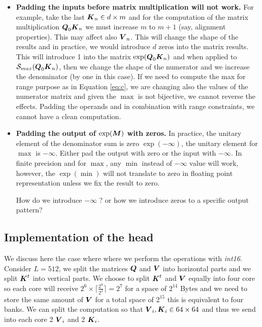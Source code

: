 \documentclass[journal]{IEEEtran}
\begin{document}
\begin{itemize}
  \item {\bf Padding the inputs before matrix multiplication will not
    work.} For example, take the last ${\boldsymbol K}_n \in d\times m$ and for
    the computation of the matrix multiplication ${\boldsymbol Q}_0{\boldsymbol K}_n$ we
    must increase $m$ to $m+1$ (say, alignment properties). This may
    affect also ${\boldsymbol V}_n$.  This will change the shape of the results
    and in practice, we would introduce $d$ zeros into the matrix
    results. This will introduce 1 into the matrix
    $\exp({\boldsymbol Q}_0{\boldsymbol K}_n)$ and when applied to
    $\Smax{\Vc{Q}_0\Vc{K}_n}$, then we change the shape of the
    numerator and we increase the denominator (by one in this
    case). If we need to compute the max for range purpose as in
    Equation \ref{eq:c}, we are changing also the values of the
    numerator matrix and given the $\max$ is not bijective, we cannot
    reverse the effects. Padding the operands and in combination with
    range constraints, we cannot have a clean computation.

  \item {\bf Padding the output of $\exp({\boldsymbol M})$ with zeros.}  In
    practice, the unitary element of the denominator sum is zero
    $\exp(-\infty)$, the unitary element for $\max$ is $-\infty$.
    Either pad the output with zero or the input with $-\infty$. In
    finite precision and for $\max$, any $\min$ instead of $-\infty$
    value will work, however, the $\exp(\min)$ will not translate to
    zero in floating point representation unless we fix the result to
    zero.

    How do we introduce $-\infty$ ? or how we introduce zeros to a
    specific output pattern?

 
    
    

\end{itemize}
















\subsection{Implementation of the head}

We discuss here the case where where we perform the operations with
{\em int16}. Consider $L=512$, we split the matrices ${\boldsymbol Q}$ and
${\boldsymbol V}$ into horizontal parts and we split ${\boldsymbol K}^t$ into vertical
parts. We choose to split ${\boldsymbol K}^t$ and ${\boldsymbol V}$ equally into four
core so each core will receive $2^6\times
\lceil\frac{2^9}{2^2}\rceil=2^7$ for a space of $2^{14}$ Bytes and we
need to store the same amount of ${\boldsymbol V}$ for a total space of
$2^{15}$ this is equivalent to four banks. We can split the
computation so that ${\boldsymbol V}_i, {\boldsymbol K}_i \in 64\times 64$ and thus we
send into each core 2 ${\boldsymbol V}_i$ and 2 ${\boldsymbol K}_i$.
\end{document}
